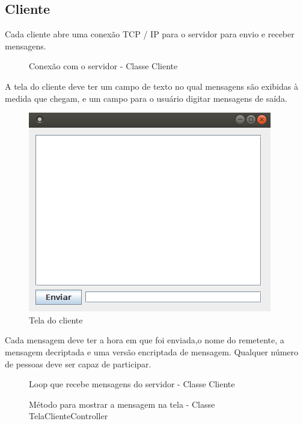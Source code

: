 \documentclass[a4paper,12pt]{article}
\begin{document}
\subsection{Cliente}
Cada cliente abre uma conexão TCP / IP para o servidor para envio e receber mensagens.
\begin{figure}[H]
	
	\caption{Conexão com o servidor - Classe Cliente}
\end{figure}
A tela do cliente deve ter um campo de texto no qual mensagens são exibidas à medida que chegam, e um campo para o usuário digitar mensagens de saída.
\begin{figure}[H]
	\centering
	\includegraphics[scale=0.6]{img/telacliente.png}    
	\caption{Tela do cliente}
	\label{fig11}     
\end{figure} 
Cada mensagem deve ter a hora em que foi enviada,o nome do remetente, a mensagem decriptada e uma versão encriptada de mensagem. Qualquer número de pessoas deve ser capaz de participar.
\begin{figure}[H]

\caption{Loop que recebe mensagens do servidor - Classe Cliente}
\end{figure}


\begin{figure}[H]

\caption{Método para mostrar a mensagem na tela - Classe TelaClienteController}
\end{figure}
\end{document}
